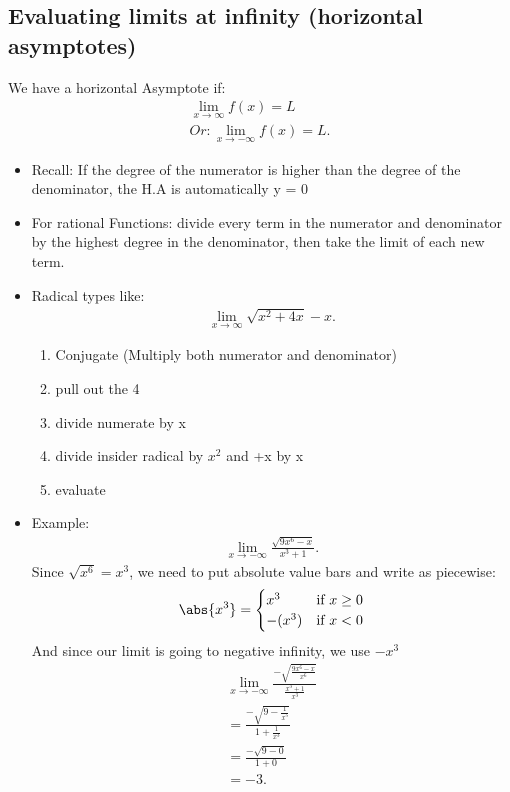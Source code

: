 \documentclass{report}
\begin{document}
      \subsection{Evaluating limits at infinity (horizontal asymptotes)}
      \bigbreak \noindent 
      We have a horizontal Asymptote if:
      \begin{align*}
        \lim\limits_{x \to \infty}{f(x) = L }\\ 
        Or:
        \lim\limits_{x \to -\infty}{f(x) = L}
      .\end{align*} 
        \begin{itemize}
          \item Recall: If the degree of the numerator is higher than the degree of the denominator, the H.A is automatically y = 0
          \item For rational Functions: divide every term in the numerator and denominator by the highest degree in the denominator, then take the limit of each new term.
          \item Radical types like:
          \begin{align*}
            \lim_{x \to \infty}{\sqrt{x^{2}+4x}-x}
          .\end{align*}
          \begin{enumerate}
            \item Conjugate (Multiply both numerator and denominator)
            \item pull out the 4
            \item divide numerate by x
            \item divide insider radical by $x^{2}$ and +x by x
            \item evaluate
          \end{enumerate}
          \item Example:
          \begin{align*}
            \lim\limits_{x \to -\infty}{\frac{\sqrt{9x^{6}-x}}{x^{3}+1}}
          .\end{align*}
          Since $\sqrt{x^{6}} = x^{3}$, we need to put absolute value bars and write as piecewise:
             \begin{equation}
              \abs{x^{3}}=
                  \begin{cases}
                      x^{3} & \text{if }  x \geq 0 \\
                       -(x^{3})& \text{if } x < 0 
                  \end{cases}
              \end{equation}
          And since our limit is going to negative infinity, we use $-x^{3} $
          \begin{align*}
            \lim\limits_{x \to -\infty}{\frac{-\sqrt{\frac{9x^{6}-x}{x^{6}}}}{\frac{x^{3}+1}{x^{3}}}} \\
            = \frac{-\sqrt{9-\frac{1}{x^{5}}}}{1+\frac{1}{x^{3}}} \\
            = \frac{-\sqrt{9-0}}{1+0} \\
            = -3
          .\end{align*}
        \end{itemize}
\end{document}
